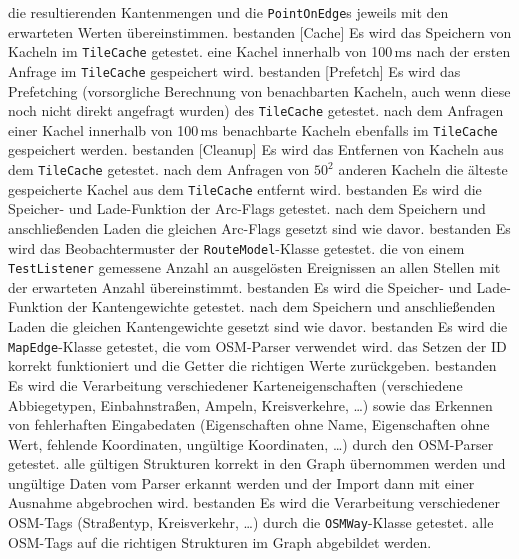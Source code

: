 \documentclass[a4paper, 11pt]{article}
\newcommand{\code}[1]{\texttt{#1}}
\begin{document}
\begin{itemize}
     {die resultierenden Kantenmengen und die \code{PointOnEdge}s jeweils mit den erwarteten Werten übereinstimmen.}
     {bestanden}
[Cache]
     {Es wird das Speichern von Kacheln im \code{TileCache} getestet.}
     {eine Kachel innerhalb von 100\,ms nach der ersten Anfrage im \code{TileCache} gespeichert wird.}
     {bestanden}
[Prefetch]
     {Es wird das Prefetching (vorsorgliche Berechnung von benachbarten Kacheln, auch wenn diese noch nicht direkt angefragt wurden) des \code{TileCache} getestet.}
     {nach dem Anfragen einer Kachel innerhalb von 100\,ms benachbarte Kacheln ebenfalls im \code{TileCache} gespeichert werden.}
     {bestanden}
[Cleanup]
     {Es wird das Entfernen von Kacheln aus dem \code{TileCache} getestet.}
     {nach dem Anfragen von $50^2$ anderen Kacheln die älteste gespeicherte Kachel aus dem \code{TileCache} entfernt wird.}
     {bestanden}
     {Es wird die Speicher- und Lade-Funktion der Arc-Flags getestet.}
     {nach dem Speichern und anschließenden Laden die gleichen Arc-Flags gesetzt sind wie davor.}
     {bestanden}
     {Es wird das Beobachtermuster der \code{RouteModel}-Klasse getestet.}
     {die von einem \code{TestListener} gemessene Anzahl an ausgelösten Ereignissen an allen Stellen mit der erwarteten Anzahl übereinstimmt.}
     {bestanden}
     {Es wird die Speicher- und Lade-Funktion der Kantengewichte getestet.}
     {nach dem Speichern und anschließenden Laden die gleichen Kantengewichte gesetzt sind wie davor.}
     {bestanden}
     {Es wird die \code{MapEdge}-Klasse getestet, die vom OSM-Parser verwendet wird.}
     {das Setzen der ID korrekt funktioniert und die Getter die richtigen Werte zurückgeben.}
     {bestanden}
     {Es wird die Verarbeitung verschiedener Karteneigenschaften (verschiedene Abbiegetypen, Einbahnstraßen, Ampeln, Kreisverkehre, \dots) sowie das Erkennen von fehlerhaften Eingabedaten (Eigenschaften ohne Name, Eigenschaften ohne Wert, fehlende Koordinaten, ungültige Koordinaten, \dots) durch den OSM-Parser getestet.}
     {alle gültigen Strukturen korrekt in den Graph übernommen werden und ungültige Daten vom Parser erkannt werden und der Import dann mit einer Ausnahme abgebrochen wird.}
     {bestanden}
     {Es wird die Verarbeitung verschiedener OSM-Tags (Straßentyp, Kreisverkehr, \dots) durch die \code{OSMWay}-Klasse getestet.}
     {alle OSM-Tags auf die richtigen Strukturen im Graph abgebildet werden.}

\end{itemize}
\end{document}
